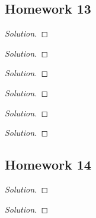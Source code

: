 \subsection{Homework 13}
\begin{problem}[WebAssign, HW 13, \# 1]
\end{problem}
\begin{proof}[Solution]
\end{proof}

\begin{problem}[WebAssign, HW 13, \# 2]
\end{problem}
\begin{proof}[Solution]
\end{proof}

\begin{problem}[WebAssign, HW 13, \# 3]
\end{problem}
\begin{proof}[Solution]
\end{proof}

\begin{problem}[WebAssign, HW 13, \# 4]
\end{problem}
\begin{proof}[Solution]
\end{proof}

\begin{problem}[WebAssign, HW 13, \# 5]
\end{problem}
\begin{proof}[Solution]
\end{proof}

\begin{problem}[WebAssign, HW 13, \# 6]
\end{problem}
\begin{proof}[Solution]
\end{proof}


\subsection{Homework 14}
\begin{problem}[WebAssign, HW 14, \# 1]
\end{problem}
\begin{proof}[Solution]
\end{proof}

\begin{problem}[WebAssign, HW 14, \# 2]
\end{problem}
\begin{proof}[Solution]
\end{proof}

